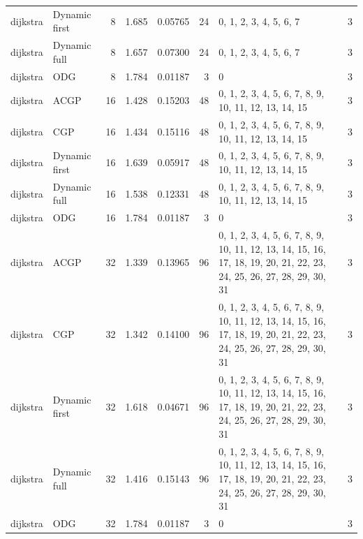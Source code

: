 \documentclass[10pt,a4paper]{article}
\begin{document}
\begin{longtable}{@{}p{23mm}p{29mm}rrrrp{36mm}r@{}}
dijkstra & Dynamic first & 8 & 1.685 & 0.05765 & 24 & 0, 1, 2, 3, 4, 5, 6, 7 & 3 \\
dijkstra & Dynamic full & 8 & 1.657 & 0.07300 & 24 & 0, 1, 2, 3, 4, 5, 6, 7 & 3 \\
dijkstra & ODG & 8 & 1.784 & 0.01187 & 3 & 0 & 3 \\
dijkstra & ACGP & 16 & 1.428 & 0.15203 & 48 & 0, 1, 2, 3, 4, 5, 6, 7, 8, 9, 10, 11, 12, 13, 14, 15 & 3 \\
dijkstra & CGP & 16 & 1.434 & 0.15116 & 48 & 0, 1, 2, 3, 4, 5, 6, 7, 8, 9, 10, 11, 12, 13, 14, 15 & 3 \\
dijkstra & Dynamic first & 16 & 1.639 & 0.05917 & 48 & 0, 1, 2, 3, 4, 5, 6, 7, 8, 9, 10, 11, 12, 13, 14, 15 & 3 \\
dijkstra & Dynamic full & 16 & 1.538 & 0.12331 & 48 & 0, 1, 2, 3, 4, 5, 6, 7, 8, 9, 10, 11, 12, 13, 14, 15 & 3 \\
dijkstra & ODG & 16 & 1.784 & 0.01187 & 3 & 0 & 3 \\
dijkstra & ACGP & 32 & 1.339 & 0.13965 & 96 & 0, 1, 2, 3, 4, 5, 6, 7, 8, 9, 10, 11, 12, 13, 14, 15, 16, 17, 18, 19, 20, 21, 22, 23, 24, 25, 26, 27, 28, 29, 30, 31 & 3 \\
dijkstra & CGP & 32 & 1.342 & 0.14100 & 96 & 0, 1, 2, 3, 4, 5, 6, 7, 8, 9, 10, 11, 12, 13, 14, 15, 16, 17, 18, 19, 20, 21, 22, 23, 24, 25, 26, 27, 28, 29, 30, 31 & 3 \\
dijkstra & Dynamic first & 32 & 1.618 & 0.04671 & 96 & 0, 1, 2, 3, 4, 5, 6, 7, 8, 9, 10, 11, 12, 13, 14, 15, 16, 17, 18, 19, 20, 21, 22, 23, 24, 25, 26, 27, 28, 29, 30, 31 & 3 \\
dijkstra & Dynamic full & 32 & 1.416 & 0.15143 & 96 & 0, 1, 2, 3, 4, 5, 6, 7, 8, 9, 10, 11, 12, 13, 14, 15, 16, 17, 18, 19, 20, 21, 22, 23, 24, 25, 26, 27, 28, 29, 30, 31 & 3 \\
dijkstra & ODG & 32 & 1.784 & 0.01187 & 3 & 0 & 3 \\
\end{longtable}\normalsize\setlength{\tabcolsep}{6pt}
\clearpage
\end{document}
